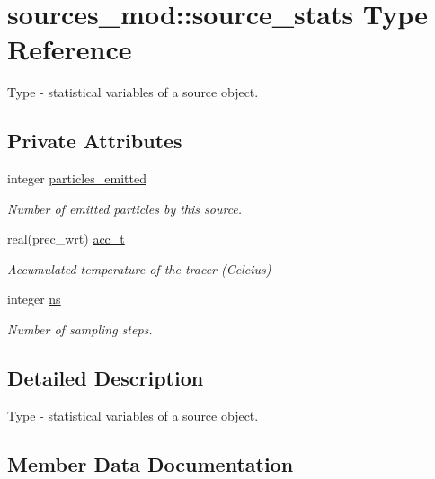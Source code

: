 \hypertarget{structsources__mod_1_1source__stats}{}\section{sources\+\_\+mod\+:\+:source\+\_\+stats Type Reference}
\label{structsources__mod_1_1source__stats}


Type -\/ statistical variables of a source object.  


\subsection*{Private Attributes}
\begin{DoxyCompactItemize}
\item 
integer \hyperlink{structsources__mod_1_1source__stats_a2253ced036ad1a9fee933b6b08135189}{particles\+\_\+emitted}
\begin{DoxyCompactList}\small\item\em Number of emitted particles by this source. \end{DoxyCompactList}\item 
real(prec\+\_\+wrt) \hyperlink{structsources__mod_1_1source__stats_a0b7d9fa17124a4e891bcfc00e39473e0}{acc\+\_\+t}
\begin{DoxyCompactList}\small\item\em Accumulated temperature of the tracer (Celcius) \end{DoxyCompactList}\item 
integer \hyperlink{structsources__mod_1_1source__stats_a77ba33fcefa55c8d8e440844ee7f4640}{ns}
\begin{DoxyCompactList}\small\item\em Number of sampling steps. \end{DoxyCompactList}\end{DoxyCompactItemize}


\subsection{Detailed Description}
Type -\/ statistical variables of a source object. 

\subsection{Member Data Documentation}
\mbox{\label{structsources__mod_1_1source__stats_a0b7d9fa17124a4e891bcfc00e39473e0}} 
